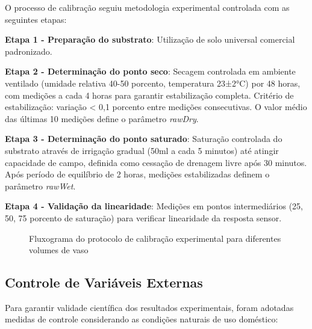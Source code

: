 \documentclass[twoside,english,brazilian]{UNISINOSmonografia}
\begin{document}
O processo de calibração seguiu metodologia experimental controlada com as seguintes etapas:

\textbf{Etapa 1 - Preparação do substrato}: Utilização de solo universal comercial padronizado.

\textbf{Etapa 2 - Determinação do ponto seco}: Secagem controlada em ambiente ventilado (umidade relativa 40-50 porcento, temperatura 23±2°C) por 48 horas, com medições a cada 4 horas para garantir estabilização completa. Critério de estabilização: variação < 0,1 porcento entre medições consecutivas. O valor médio das últimas 10 medições define o parâmetro \textit{rawDry}.

\textbf{Etapa 3 - Determinação do ponto saturado}: Saturação controlada do substrato através de irrigação gradual (50ml a cada 5 minutos) até atingir capacidade de campo, definida como cessação de drenagem livre após 30 minutos. Após período de equilíbrio de 2 horas, medições estabilizadas definem o parâmetro \textit{rawWet}.

\textbf{Etapa 4 - Validação da linearidade}: Medições em pontos intermediários (25, 50, 75 porcento de saturação) para verificar linearidade da resposta sensor.

\begin{figure}[htbp]
\centering
\caption{Fluxograma do protocolo de calibração experimental para diferentes volumes de vaso}
\label{fig:protocolo_calibracao}
\end{figure}

\subsection{Controle de Variáveis Externas}

Para garantir validade científica dos resultados experimentais, foram adotadas medidas de controle considerando as condições naturais de uso doméstico:
\end{document}
